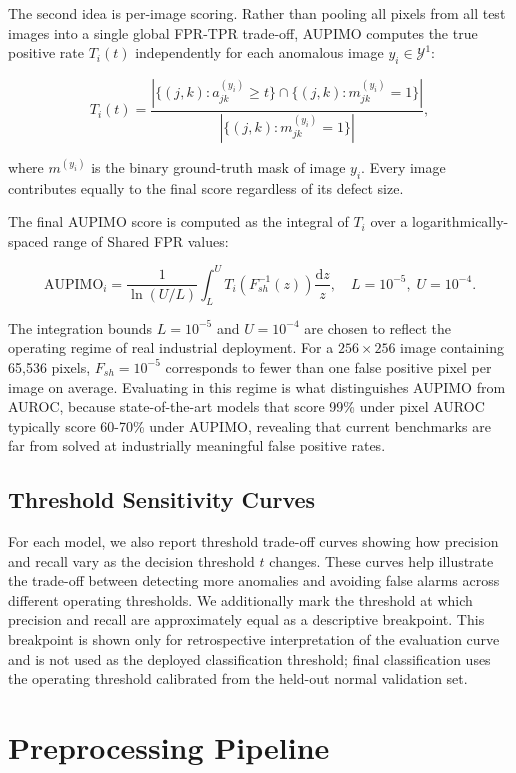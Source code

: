 \documentclass[11pt, a4paper]{article}
\begin{document}
The second idea is per-image scoring. Rather than pooling all pixels from all test images into a single global FPR-TPR trade-off, AUPIMO computes the true positive rate $T_i(t)$ independently for each anomalous image $y_i \in \mathcal{Y}^1$:

\[
T_i(t) = \frac{|\{(j,k) : a_{jk}^{(y_i)} \geq t\} \cap \{(j,k) : m_{jk}^{(y_i)} = 1\}|}{|\{(j,k) : m_{jk}^{(y_i)} = 1\}|},
\]

where $m^{(y_i)}$ is the binary ground-truth mask of image $y_i$. Every image contributes equally to the final score regardless of its defect size.

The final AUPIMO score is computed as the integral of $T_i$ over a logarithmically-spaced range of Shared FPR values:

\[
\mathrm{AUPIMO}_i = \frac{1}{\ln(U/L)} \int_{L}^{U} T_i\!\left(F_{sh}^{-1}(z)\right) \frac{\mathrm{d}z}{z}, \quad L = 10^{-5},\; U = 10^{-4}.
\]

The integration bounds $L = 10^{-5}$ and $U = 10^{-4}$ are chosen to reflect the operating regime of real industrial deployment. For a $256 \times 256$ image containing 65,536 pixels, $F_{sh} = 10^{-5}$ corresponds to fewer than one false positive pixel per image on average. Evaluating in this regime is what distinguishes AUPIMO from AUROC, because state-of-the-art models that score 99\% under pixel AUROC typically score 60-70\% under AUPIMO, revealing that current benchmarks are far from solved at industrially meaningful false positive rates.

\subsection{Threshold Sensitivity Curves}

For each model, we also report threshold trade-off curves showing how precision and recall vary as the decision threshold $t$ changes. These curves help illustrate the trade-off between detecting more anomalies and avoiding false alarms across different operating thresholds. We additionally mark the threshold at which precision and recall are approximately equal as a descriptive breakpoint. This breakpoint is shown only for retrospective interpretation of the evaluation curve and is not used as the deployed classification threshold; final classification uses the operating threshold calibrated from the held-out normal validation set.

\section{Preprocessing Pipeline}
\label{sec:preprocessing}
\end{document}
